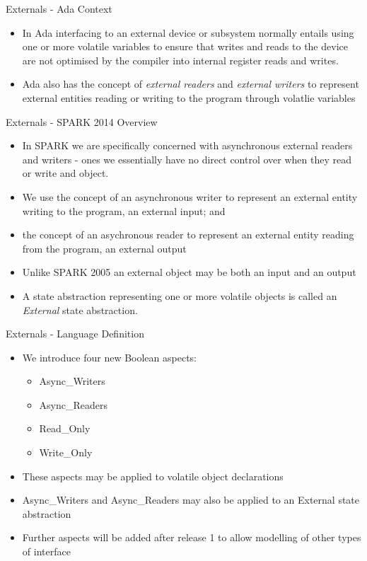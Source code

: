 \documentclass{beamer}
\begin{document}
\begin{frame}{Externals - Ada Context}

  \begin{itemize}
  \item In Ada interfacing to an external device or subsystem normally
    entails using one or more volatile variables to ensure that writes
    and reads to the device are not optimised by the compiler into
    internal register reads and writes.
  \item Ada also has the concept of \emph {external readers} and \emph
    {external writers} to represent external entities reading or
    writing to the program through volatlie variables
  \end{itemize}
 
\end{frame}

\begin{frame}{Externals - SPARK 2014 Overview}

  \begin{itemize}
 \item In SPARK we are specifically concerned with asynchronous
   external readers and writers - ones we essentially have no direct
   control over when they read or write and object.
  \item We use the concept of an asynchronous writer to represent an
    external entity writing to the program, an external input; and
 \item the concept of an asychronous reader to represent an external
   entity reading from the program, an external output
 \item Unlike SPARK 2005 an external object may be both an input and
   an output
 \item A state abstraction representing one or more volatile objects
   is called an \emph {External} state abstraction.  
  \end{itemize}
 
\end{frame}

\begin{frame}{Externals - Language Definition}

  \begin{itemize}
  \item We introduce four new Boolean aspects:
    \begin{itemize}
    \item Async\_Writers
    \item Async\_Readers
    \item Read\_Only
    \item Write\_Only
    \end{itemize}
  \item These aspects may be applied to volatile object declarations
  \item Async\_Writers and Async\_Readers may also be applied to an
    External state abstraction
  \item Further aspects will be added after release 1 to allow modelling of other types of interface
  \end{itemize}
 
\end{frame}
\end{document}

